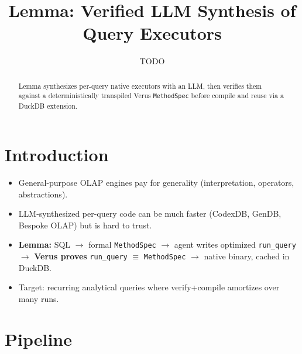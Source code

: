 \documentclass[sigconf, nonacm]{acmart}
\begin{document}
\title{Lemma: Verified LLM Synthesis of Query Executors}

\author{TODO}

\begin{abstract}
Lemma synthesizes per-query native executors with an LLM, then verifies them
against a deterministically transpiled Verus \texttt{MethodSpec} before compile
and reuse via a DuckDB extension.
\end{abstract}

\maketitle

\vldbtopmatter

\section{Introduction}

\begin{itemize}
  \item General-purpose OLAP engines pay for generality (interpretation, operators, abstractions).
  \item LLM-synthesized per-query code can be much faster (CodexDB, GenDB, Bespoke OLAP) but is hard to trust.
  \item \textbf{Lemma:} SQL $\to$ formal \texttt{MethodSpec} $\to$ agent writes optimized \texttt{run\_query} $\to$ \textbf{Verus proves} \texttt{run\_query} $\equiv$ \texttt{MethodSpec} $\to$ native binary, cached in DuckDB.
  \item Target: recurring analytical queries where verify+compile amortizes over many runs.
\end{itemize}

\section{Pipeline}
\end{document}
